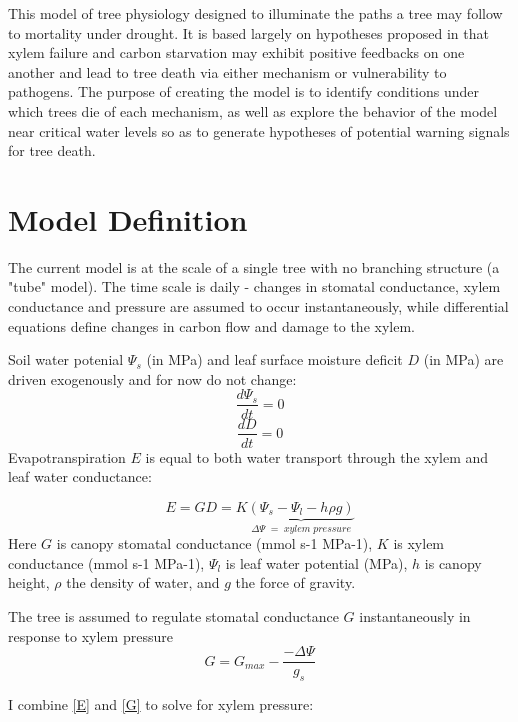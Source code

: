 \documentclass[12pt]{amsart}
\begin{document}
This model of tree physiology designed to illuminate the paths a tree may follow to mortality under drought.  It is based largely on hypotheses proposed in \citet{McDowell2011} that xylem failure and carbon starvation may exhibit positive feedbacks on one another and lead to tree death via either mechanism or vulnerability to pathogens.  The purpose of creating the model is to identify  conditions under which trees die of each mechanism, as well as explore the behavior of the model near critical water levels so as to generate hypotheses of potential warning signals for tree death.

\section{Model Definition}

The current model is at the scale of a single tree with no branching structure (a "tube" model).  The time scale is daily - changes in stomatal conductance, xylem conductance and pressure are assumed to occur instantaneously, while differential equations define changes in carbon flow and damage to the xylem.

Soil water potenial $\Psi_s$ (in MPa) and leaf surface moisture deficit $D$ (in MPa) are driven exogenously and for now do not change:
\begin{equation}\label{Psi_s}
\frac{d\Psi_s}{dt} = 0
\end{equation}
\begin{equation}\label{sD}
\frac{dD}{dt} = 0
\end{equation}
Evapotranspiration $E$ is equal to both water transport through the xylem and leaf water conductance:

\begin{equation}\label{E}
E = GD = K\underbrace{(\Psi_s - \Psi_l - h\rho g)}_{\Delta\Psi \; = \;xylem\;  pressure}
\end{equation}
Here $G$ is canopy stomatal conductance (mmol s-1 MPa-1), $K$ is xylem conductance (mmol s-1 MPa-1), $\Psi_l$ is leaf water potential (MPa), $h$ is canopy height, $\rho$ the density of water, and $g$ the force of gravity.

The tree is assumed to regulate stomatal conductance $G$ instantaneously in response to xylem pressure
\begin{equation}\label{G}
G = G_{max} - \frac{-\Delta\Psi}{g_s}
\end{equation}

I combine \eqref{E} and \eqref{G} to solve for xylem pressure:
\end{document}
